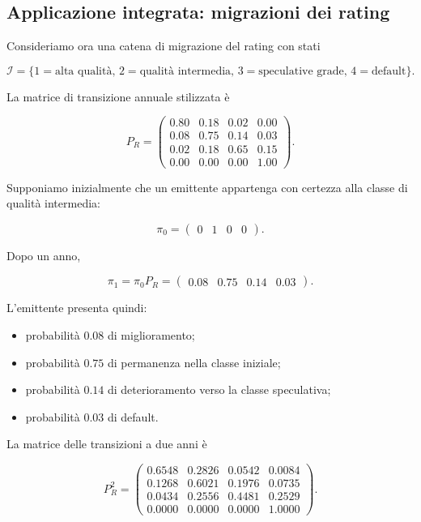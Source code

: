 \subsection{Applicazione integrata: migrazioni dei rating}

Consideriamo ora una catena di migrazione del rating con stati

\[
\mathcal{I}
=
\{
1=\text{alta qualit\`{a}},
\,
2=\text{qualit\`{a} intermedia},
\,
3=\text{speculative grade},
\,
4=\text{default}
\}.
\]

La matrice di transizione annuale stilizzata \`{e}

\[
P_R
=
\begin{pmatrix}
0.80 & 0.18 & 0.02 & 0.00\\
0.08 & 0.75 & 0.14 & 0.03\\
0.02 & 0.18 & 0.65 & 0.15\\
0.00 & 0.00 & 0.00 & 1.00
\end{pmatrix}.
\]

Supponiamo inizialmente che un emittente appartenga con certezza alla
classe di qualit\`{a} intermedia:

\[
\pi_0
=
\begin{pmatrix}
0&1&0&0
\end{pmatrix}.
\]

Dopo un anno,

\[
\pi_1
=
\pi_0P_R
=
\begin{pmatrix}
0.08&0.75&0.14&0.03
\end{pmatrix}.
\]

L'emittente presenta quindi:

\begin{itemize}

\item probabilit\`{a} \(0.08\) di miglioramento;

\item probabilit\`{a} \(0.75\) di permanenza nella classe iniziale;

\item probabilit\`{a} \(0.14\) di deterioramento verso la classe
speculativa;

\item probabilit\`{a} \(0.03\) di default.
\end{itemize}

La matrice delle transizioni a due anni \`{e}

\[
P_R^2
=
\begin{pmatrix}
0.6548 & 0.2826 & 0.0542 & 0.0084\\
0.1268 & 0.6021 & 0.1976 & 0.0735\\
0.0434 & 0.2556 & 0.4481 & 0.2529\\
0.0000 & 0.0000 & 0.0000 & 1.0000
\end{pmatrix}.
\]

